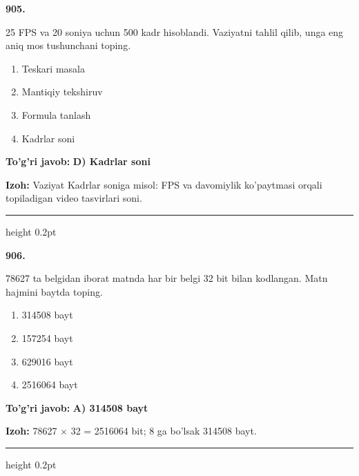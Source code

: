 \documentclass[10pt,a4paper,oneside]{article}
\begin{document}
\noindent\textbf{\color{ink}905.}
\par
25 FPS va 20 soniya uchun 500 kadr hisoblandi. Vaziyatni tahlil qilib, unga eng aniq mos tushunchani toping.
\begin{enumerate}[label=\Alph*),leftmargin=9mm]
\item Teskari masala
\item Mantiqiy tekshiruv
\item Formula tanlash
\item Kadrlar soni
\end{enumerate}
\begin{tcolorbox}[enhanced,breakable,colback=teal!4,colframe=teal!50!black,boxrule=0.5pt,arc=1.1mm,left=3mm,right=3mm,top=1.7mm,bottom=1.7mm,before skip=2mm,after skip=2mm]
\textbf{\color{teal}To'g'ri javob:} \textbf{D) Kadrlar soni}
\par\smallskip
\textbf{Izoh:} Vaziyat Kadrlar soniga misol: FPS va davomiylik ko'paytmasi orqali topiladigan video tasvirlari soni.
\end{tcolorbox}
\vspace{2mm}\hrule height 0.2pt \vspace{3mm}

\noindent\textbf{\color{ink}906.}
\par
78627 ta belgidan iborat matnda har bir belgi 32 bit bilan kodlangan. Matn hajmini baytda toping.
\begin{enumerate}[label=\Alph*),leftmargin=9mm]
\item 314508 bayt
\item 157254 bayt
\item 629016 bayt
\item 2516064 bayt
\end{enumerate}
\begin{tcolorbox}[enhanced,breakable,colback=teal!4,colframe=teal!50!black,boxrule=0.5pt,arc=1.1mm,left=3mm,right=3mm,top=1.7mm,bottom=1.7mm,before skip=2mm,after skip=2mm]
\textbf{\color{teal}To'g'ri javob:} \textbf{A) 314508 bayt}
\par\smallskip
\textbf{Izoh:} 78627 \ensuremath{\times} 32 = 2516064 bit; 8 ga bo'lsak 314508 bayt.
\end{tcolorbox}
\vspace{2mm}\hrule height 0.2pt \vspace{3mm}
\end{document}
